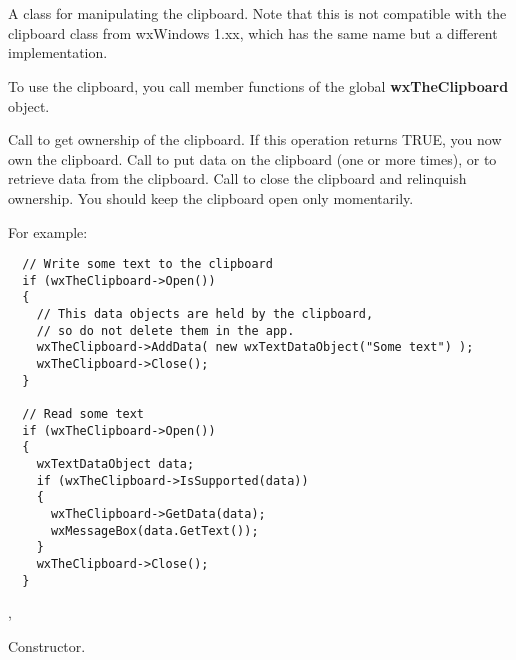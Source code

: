 \section{}\label{wxclipboard}

A class for manipulating the clipboard. Note that this is not compatible with the
clipboard class from wxWindows 1.xx, which has the same name but a different implementation.

To use the clipboard, you call member functions of the global {\bf wxTheClipboard} object.

Call  to get ownership of the clipboard. If this operation returns TRUE, you
now own the clipboard. Call  to put data
on the clipboard (one or more times), or  to
retrieve data from the clipboard. Call  to close
the clipboard and relinquish ownership. You should keep the clipboard open only momentarily.

For example:

\begin{verbatim}
  // Write some text to the clipboard
  if (wxTheClipboard->Open())
  {
    // This data objects are held by the clipboard, 
    // so do not delete them in the app.
    wxTheClipboard->AddData( new wxTextDataObject("Some text") );
    wxTheClipboard->Close();
  }

  // Read some text
  if (wxTheClipboard->Open())
  {
    wxTextDataObject data;
    if (wxTheClipboard->IsSupported(data))
    {
      wxTheClipboard->GetData(data);
      wxMessageBox(data.GetText());
    }  
    wxTheClipboard->Close();
  }
\end{verbatim}




, 




Constructor.


